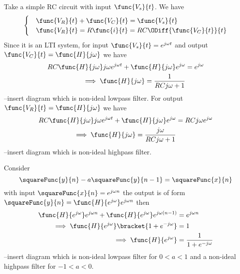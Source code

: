 \begin{example}
    Take a simple RC circuit with input \(\func{V_s}{t}\). We have 
    \begin{equation*}
        \begin{cases}
            &\func{V_R}{t} + \func{V_C}{t} = \func{V_s}{t}\\
            & \func{V_R}{t} = R \func{i}{t} = RC \ODiff{\func{V_C}{t}}{t}
        \end{cases}
    \end{equation*}
Since it is an LTI system, for input \(\func{V_s}{t} = e^{j\omega t}\) and output \(\func{V_C}{t} = \func{H}{j\omega}\) we have 
\begin{align*}
    RC \func{H}{j\omega}j \omega e^{j \omega t} + \func{H}{j \omega} e^{j\omega}&= e^{j \omega} \\
    \implies \func{H}{j \omega} = \dfrac{1}{RC j \omega + 1}
\end{align*}
--insert diagram which is non-ideal lowpass filter. For output \(\func{V_R}{t} = \func{H}{j\omega}\) we have 
\begin{align*}
    RC \func{H}{j\omega}j \omega e^{j \omega t} + \func{H}{j \omega} e^{j\omega}&= RC j \omega e^{j \omega} \\
    \implies \func{H}{j \omega} = \dfrac{j\omega }{RC j \omega + 1}
\end{align*}
--insert diagram which is non-ideal highpass filter.
\end{example}
\begin{example}
    Consider 
    \begin{equation*}
        \squareFunc{y}{n} - a \squareFunc{y}{n-1}= \squareFunc{x}{n}
    \end{equation*}
    with input \(\squareFunc{x}{n} = e^{j\omega n}\) the output is of form \(\squareFunc{y}{n} = \func{H}{e^{j\omega}} e^{j \omega n}\) then 
    \begin{align*}
        \func{H}{e^{j\omega}} e^{j \omega n} + \func{H}{e^{j\omega}} e^{j \omega (n - 1)} &= e^{j \omega n}\\
        \implies \func{H}{e^{j\omega}} \bracket{1 + e^{-j \omega}} &= 1\\
        \implies \func{H}{e^{j\omega}} &= \dfrac{1}{1 + e^{-j\omega}}
    \end{align*}
    --insert diagram which is non-ideal lowpass filter for \(0 < a < 1\) and a non-ideal highpass filter for \(-1 < a < 0\).
\end{example}

